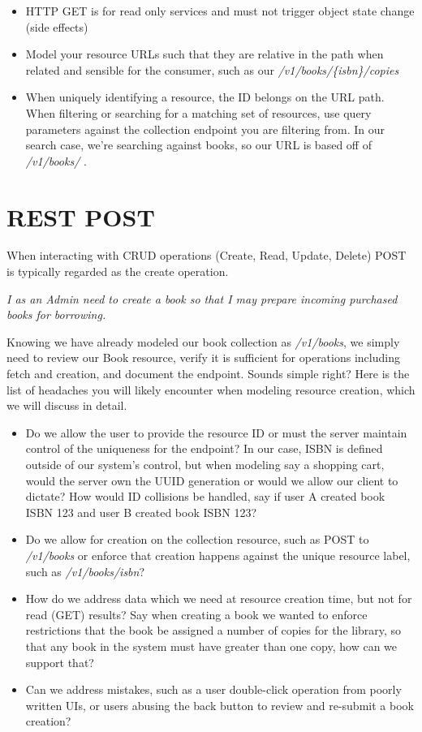 \begin{itemize}
  \item HTTP GET is for read only services and must not trigger object state change (side effects)
  \item Model your resource URLs such that they are relative in the path when related and sensible for the consumer, such as our \textit{/v1/books/\{isbn\}/copies}
  \item When uniquely identifying a resource, the ID belongs on the URL path.  When filtering or searching for a matching set of resources, use query parameters against the collection endpoint you are filtering from.  In our search case, we're searching against books, so our URL is based off of \textit{/v1/books/} .
\end{itemize}

\section{REST POST}

When interacting with CRUD operations (Create, Read, Update, Delete) POST is typically regarded as the create operation.

\textit{I as an Admin need to create a book so that I may prepare incoming purchased books for borrowing.}

Knowing we have already modeled our book collection as \textit{/v1/books}, we simply need to review our Book resource, verify it is sufficient for operations including fetch and creation, and document the endpoint.  Sounds simple right?  Here is the list of headaches you will likely encounter when modeling resource creation, which we will discuss in detail.

\begin{itemize}
  \item Do we allow the user to provide the resource ID or must the server maintain control of the uniqueness for the endpoint?  In our case, ISBN is defined outside of our system's control, but when modeling say a shopping cart, would the server own the UUID generation or would we allow our client to dictate?  How would ID collisions be handled, say if user A created book ISBN 123 and user B created book ISBN 123?
  \item Do we allow for creation on the collection resource, such as POST to \textit{/v1/books} or enforce that creation happens against the unique resource label, such as \textit{/v1/books/isbn}?
  \item How do we address data which we need at resource creation time, but not for read (GET) results? Say when creating a book we wanted to enforce restrictions that the book be assigned a number of copies for the library, so that any book in the system must have greater than one copy, how can we support that?
  \item Can we address mistakes, such as a user double-click operation from poorly written UIs, or users abusing the back button to review and re-submit a book creation?
\end{itemize}

